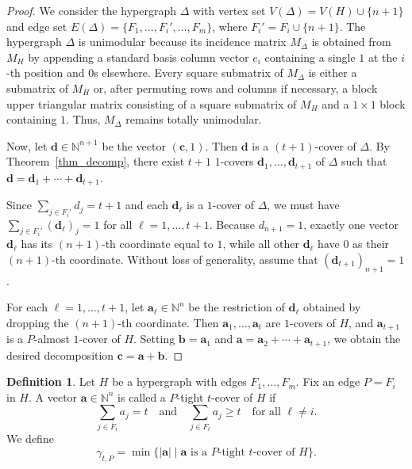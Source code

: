 \documentclass[12pt,amscd]{amsart}
\theoremstyle{definition}
\newtheorem{defn}[thm]{Definition}
\numberwithin{equation}{section}
\begin{document}
\begin{proof}
We consider the hypergraph $\Delta$ with vertex set $V(\Delta) = V(H) \cup \{n+1\}$ and edge set $E(\Delta) = \{F_1, \ldots, F_i', \dots, F_m\}$, where $F_i' = F_i \cup \{n+1\}$. The hypergraph $\Delta$ is unimodular because its incidence matrix $M_\Delta$ is obtained from $M_H$ by appending a standard basis column vector $e_{i}$ containing a single $1$ at the $i$-th position and $0$s elsewhere. Every square submatrix of $M_\Delta$ is either a submatrix of $M_H$ or, after permuting rows and columns if necessary, a block upper triangular matrix consisting of a square submatrix of $M_H$ and a $1 \times 1$ block containing $1$. Thus, $M_\Delta$ remains totally unimodular.

Now, let $\mathbf{d} \in \mathbb{N}^{n+1}$ be the vector $(\mathbf{c}, 1)$. Then $\mathbf{d}$ is a $(t+1)$-cover of $\Delta$. By Theorem~\ref{thm_decomp}, there exist $t+1$ $1$-covers $\mathbf{d}_1, \ldots, \mathbf{d}_{t+1}$ of $\Delta$ such that $\mathbf{d} = \mathbf{d}_1 + \cdots + \mathbf{d}_{t+1}$. 

Since $\sum_{j \in F_i'} d_j = t+1$ and each $\mathbf{d}_\ell$ is a $1$-cover of $\Delta$, we must have $\sum_{j \in F_i'} (\mathbf{d}_\ell)_j = 1$ for all $\ell = 1, \ldots, t+1$. Because $d_{n+1} = 1$, exactly one vector $\mathbf{d}_\ell$ has its $(n+1)$-th coordinate equal to $1$, while all other $\mathbf{d}_\ell$ have $0$ as their $(n+1)$-th coordinate. Without loss of generality, assume that $(\mathbf{d}_{t+1})_{n+1} = 1$.

For each $\ell = 1, \ldots, t+1$, let $\mathbf{a}_\ell \in \mathbb{N}^n$ be the restriction of $\mathbf{d}_\ell$ obtained by dropping the $(n+1)$-th coordinate. Then $\mathbf{a}_1, \ldots, \mathbf{a}_t$ are $1$-covers of $H$, and $\mathbf{a}_{t+1}$ is a $P$-almost $1$-cover of $H$. Setting $\mathbf{b} = \mathbf{a}_1$ and $\mathbf{a} = \mathbf{a}_2 + \cdots + \mathbf{a}_{t+1}$, we obtain the desired decomposition $\mathbf{c} = \mathbf{a} + \mathbf{b}$.
\end{proof}

\begin{defn}
Let $H$ be a hypergraph with edges $F_1, \ldots, F_m$. Fix an edge $P = F_i$ in $H$. A vector $\mathbf{a} \in \mathbb{N}^n$ is called a $P$-tight $t$-cover of $H$ if 
\[
\sum_{j \in F_i} a_j = t \quad \text{and} \quad \sum_{j \in F_\ell} a_j \ge t \quad \text{for all } \ell \neq i.
\]
We define
\[
\gamma_{t,P} = \min \{ |\mathbf{a}| \mid \mathbf{a} \text{ is a } P\text{-tight } t\text{-cover of } H \}.
\]
\end{defn}
\end{document}
